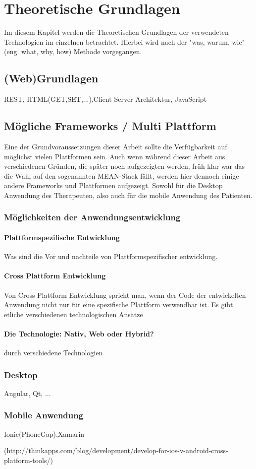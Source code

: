 \chapter{Theoretische Grundlagen} \label{Theoretische Grundlagen}
Im diesem Kapitel werden die Theoretischen Grundlagen der verwendeten Technologien im einzelnen betrachtet. Hierbei wird nach der "was, warum, wie"(eng. what, why, how) Methode vorgegangen. 
\section{(Web)Grundlagen}
REST, HTML(GET,SET,...),Client-Server Architektur, JavaScript
\section{Mögliche Frameworks / Multi Plattform}
Eine der Grundvoraussetzungen dieser Arbeit sollte die Verfügbarkeit auf möglichst vielen Plattformen sein. Auch wenn während dieser Arbeit aus verschiedenen Gründen, die später noch aufgezeigten werden, früh klar war das die Wahl auf den sogenannten MEAN-Stack fällt, werden hier dennoch einige andere Frameworks und Plattformen aufgezeigt. Sowohl für die Desktop Anwendung des Therapeuten, also auch für die mobile Anwendung des Patienten.
\subsection{Möglichkeiten der Anwendungsentwicklung}
\subsubsection{Plattformspezifische Entwicklung}
Was sind die Vor und nachteile von Plattformspezifischer entwicklung.
\subsubsection{Cross Plattform Entwicklung}
Von Cross Plattform Entwicklung spricht man, wenn der Code der entwickelten Anwendung nicht nur für eine spezifische Plattform verwendbar ist. Es gibt etliche verschiedenen technologischen Ansätze \todo{}

\subsubsection{Die Technologie: Nativ, Web oder Hybrid?}

durch verschiedene Technologien
\subsection{Desktop}
Angular, Qt, ...
\subsection{Mobile Anwendung}
Ionic(PhoneGap),Xamarin  

 (http://thinkapps.com/blog/development/develop-for-ios-v-android-cross-platform-tools/) 


